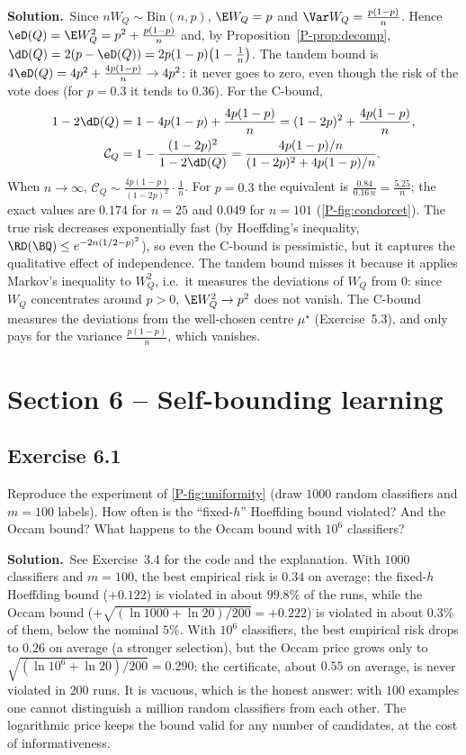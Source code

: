 \documentclass[11pt]{article}
\newcommand{\statement}[1]{\begin{tcolorbox}[enhanced,breakable,colback=black!3,colframe=black!25,boxrule=0.4pt,sharp corners,fontupper=\itshape\small]#1\end{tcolorbox}}
\newcommand{\exo}[1]{\Needspace{6\baselineskip}\subsection*{Exercise #1}\addcontentsline{toc}{subsection}{Exercise #1}}
\newcommand{\sol}{\noindent\textbf{Solution.}\ }
\begin{document}
\sol Since $nW_Q\sim\mathrm{Bin}(n,p)$, $\E W_Q=p$ and $\Var W_Q=\frac{p(1-p)}n$. Hence
$\eD(Q)=\E W_Q^2=p^2+\frac{p(1-p)}n$ and, by Proposition~\ref{P-prop:decomp}, $\dD(Q)=2(p-\eD(Q))=2p(1-p)\big(1-\frac1n\big)$. The tandem
bound is $4\eD(Q)=4p^2+\frac{4p(1-p)}n\to4p^2$: it never goes to zero, even though the risk of the vote does (for $p=0.3$
it tends to $0.36$). For the C-bound,
\begin{align*}
1-2\dD(Q)&=1-4p(1-p)+\frac{4p(1-p)}n=(1-2p)^2+\frac{4p(1-p)}n,\\
\mathcal C_Q&=1-\frac{(1-2p)^2}{1-2\dD(Q)}=\frac{4p(1-p)/n}{(1-2p)^2+4p(1-p)/n}.
\end{align*}
When $n\to\infty$, $\mathcal C_Q\sim\frac{4p(1-p)}{(1-2p)^2}\cdot\frac1n$. For $p=0.3$ the equivalent is $\frac{0.84}{0.16\,n}=\frac{5.25}n$; the exact values are $0.174$ for $n=25$ and $0.049$ for
$n=101$ (\cref{P-fig:condorcet}). The true risk decreases exponentially fast (by Hoeffding's inequality,
$\RD(\BQ)\leq e^{-2n(1/2-p)^2}$), so even the C-bound is pessimistic, but it captures the qualitative effect of independence.
The tandem bound misses it because it applies Markov's inequality to $W_Q^2$, i.e.\ it measures the deviations of
$W_Q$ from $0$: since $W_Q$ concentrates around $p>0$, $\E W_Q^2\to p^2$ does not vanish. The C-bound measures the deviations
from the well-chosen centre $\mu^\star$ (Exercise~5.3), and only pays for the variance $\frac{p(1-p)}n$, which vanishes.

\section*{Section 6 -- Self-bounding learning}

\exo{6.1}
\statement{Reproduce the experiment of \cref{P-fig:uniformity} (draw $1000$ random classifiers and $m=100$ labels). How often
is the ``fixed-$h$'' Hoeffding bound violated? And the Occam bound? What happens to the Occam bound with $10^6$
classifiers?}

\sol See Exercise~3.4 for the code and the explanation. With $1000$ classifiers and $m=100$, the best empirical risk is
$0.34$ on average; the fixed-$h$ Hoeffding bound ($+0.122$) is violated in about $99.8\%$ of the runs, while the Occam
bound ($+\sqrt{(\ln1000+\ln20)/200}=+0.222$) is violated in about $0.3\%$ of them, below the nominal $5\%$. With $10^6$
classifiers, the best empirical risk drops to $0.26$ on average (a stronger selection), but the Occam price grows only
to $\sqrt{(\ln10^6+\ln20)/200}=0.290$: the certificate, about $0.55$ on average, is never violated in $200$ runs. It is
vacuous, which is the honest answer: with $100$ examples one cannot distinguish a million random classifiers from each
other. The logarithmic price keeps the bound valid for any number of candidates, at the cost of informativeness.
\end{document}
